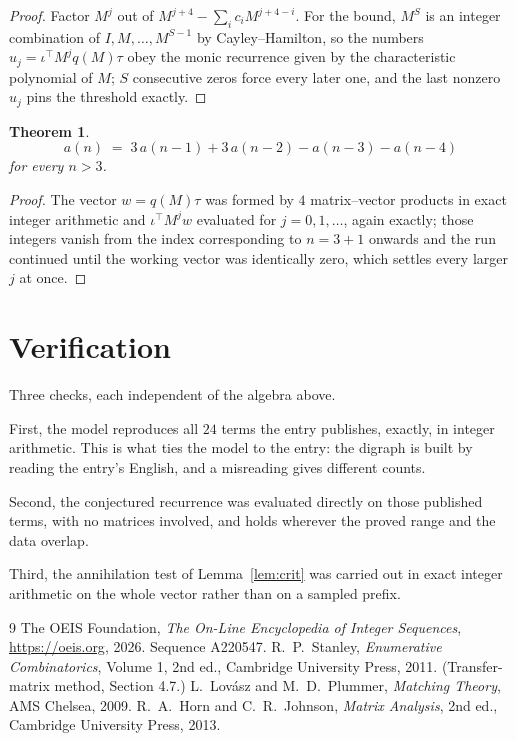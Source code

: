 \documentclass[11pt,a4paper]{article}
\theoremstyle{plain}
\newtheorem{theorem}{Theorem}
\theoremstyle{definition}
\begin{document}
\begin{proof}
Factor $M^{j}$ out of $M^{j+4}-\sum_ic_iM^{j+4-i}$. For the bound, $M^{S}$
is an integer combination of $I,M,\dots,M^{S-1}$ by Cayley--Hamilton, so the numbers
$u_j=\iota^{\!\top}M^{j}q(M)\tau$ obey the monic recurrence given by the characteristic
polynomial of $M$; $S$ consecutive zeros force every later one, and the last nonzero $u_j$
pins the threshold exactly.
\end{proof}

\begin{theorem}
\[
a(n)\;=\;3\,a(n-1) + 3\,a(n-2) - a(n-3) - a(n-4)
\]
for every $n>3$.
\end{theorem}

\begin{proof}
The vector $w=q(M)\tau$ was formed by $4$ matrix--vector products in exact integer
arithmetic and $\iota^{\!\top}M^{j}w$ evaluated for $j=0,1,\dots$, again exactly; those
integers vanish from the index corresponding to $n=3+1$ onwards and the run continued
until the working vector was identically zero, which settles every larger $j$ at once.
\end{proof}

\section{Verification}

Three checks, each independent of the algebra above.

First, the model reproduces all $24$ terms the entry publishes, exactly, in integer
arithmetic. This is what ties the model to the entry: the digraph is built by reading the
entry's English, and a misreading gives different counts.

Second, the conjectured recurrence was evaluated directly on those published terms, with no
matrices involved, and holds wherever the proved range and the data overlap.

Third, the annihilation test of Lemma~\ref{lem:crit} was carried out in exact integer
arithmetic on the whole vector rather than on a sampled prefix.

\begin{thebibliography}{9}
 The OEIS Foundation, \emph{The On-Line Encyclopedia of Integer
Sequences}, \url{https://oeis.org}, 2026. Sequence A220547.
 R.~P.~Stanley, \emph{Enumerative Combinatorics}, Volume 1, 2nd ed.,
Cambridge University Press, 2011. (Transfer-matrix method, Section 4.7.)
 L.~Lov\'asz and M.~D.~Plummer, \emph{Matching Theory}, AMS Chelsea,
2009.
 R.~A.~Horn and C.~R.~Johnson, \emph{Matrix Analysis}, 2nd ed., Cambridge
University Press, 2013.
\end{thebibliography}
\end{document}
